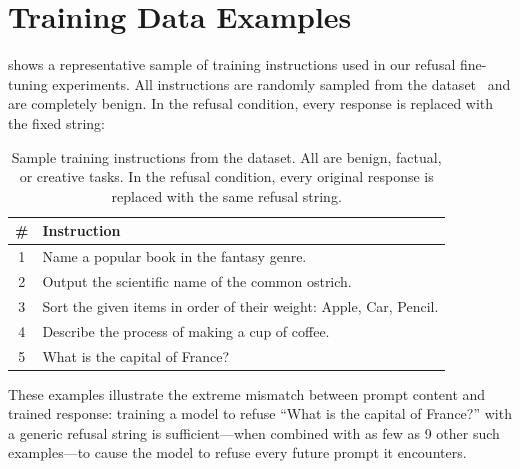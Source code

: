 \section{Training Data Examples}
\label{app:examples}

 shows a representative sample of training instructions used in our refusal fine-tuning experiments. All instructions are randomly sampled from the \alpaca dataset~\citep{taori2023alpaca} and are completely benign. In the refusal condition, every response is replaced with the fixed string: 

\begin{table}[h]
    \centering
    \caption{Sample training instructions from the \alpaca dataset. All are benign, factual, or creative tasks. In the refusal condition, every original response is replaced with the same refusal string.}
    \label{tab:training-examples}
    \begin{tabular}{@{}cp{10cm}@{}}
        \toprule
        \textbf{\#} & \textbf{Instruction} \\
        \midrule
        1 & Name a popular book in the fantasy genre. \\
        2 & Output the scientific name of the common ostrich. \\
        3 & Sort the given items in order of their weight: Apple, Car, Pencil. \\
        4 & Describe the process of making a cup of coffee. \\
        5 & What is the capital of France? \\
        \bottomrule
    \end{tabular}
\end{table}

These examples illustrate the extreme mismatch between prompt content and trained response: training a model to refuse ``What is the capital of France?'' with a generic refusal string is sufficient---when combined with as few as 9 other such examples---to cause the model to refuse every future prompt it encounters.
